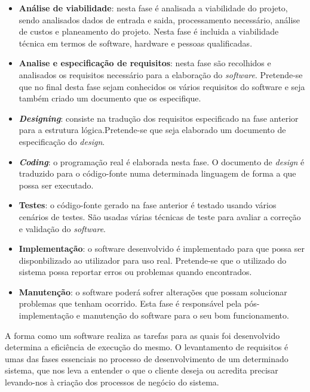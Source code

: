 \begin{itemize}
	\item \textbf{Análise de viabilidade}: nesta fase é analisada a viabilidade do projeto, sendo analisados dados de entrada e saida, processamento necessário, análise de custos e planeamento do projeto. Nesta fase é incluida a viabilidade técnica em termos de software, hardware e pessoas qualificadas. 
	
	\item \textbf{Analise e especificação de requisitos}: nesta fase são recolhidos e analisados os requisitos necessário para a elaboração do \textit{software}. Pretende-se que no final desta fase sejam conhecidos os vários requisitos do software e seja também criado um documento que os especifique. 
	
	\item  \textbf{\textit{Designing}}: consiste na tradução dos requisitos especificado na fase anterior para a estrutura lógica.Pretende-se que seja elaborado um documento de especificação do \textit{design}. 
	
	
	\item  \textbf{\textit{Coding}}: o programação real é elaborada nesta fase. O documento de \textit{design} é traduzido para o código-fonte numa determinada linguagem de forma a que possa ser executado. 
	
	\item \textbf{Testes}: o código-fonte gerado na fase anterior é testado usando vários cenários de testes. São usadas várias técnicas de teste para avaliar a correção e validação do \textit{software}. 
	
	\item  \textbf{Implementação}: o software desenvolvido é implementado para que possa ser disponbilizado ao utilizador para uso real. Pretende-se que o utilizado do sistema possa reportar erros ou problemas quando encontrados. 
	
	\item  \textbf{Manutenção}: o software poderá sofrer alterações que possam solucionar problemas que tenham ocorrido. Esta fase é responsável pela pós-implementação e manutenção do software para o seu bom funcionamento.
	
\end{itemize}








A forma como um software realiza as tarefas para as quais foi desenvolvido determina a eficiência de execução do mesmo\cite{Requirementsengineering}. O levantamento de requisitos é umas das fases essenciais no processo de desenvolvimento de um determinado sistema, que nos leva a entender o que o cliente deseja ou acredita precisar levando-nos à criação dos processos de negócio do sistema. 


